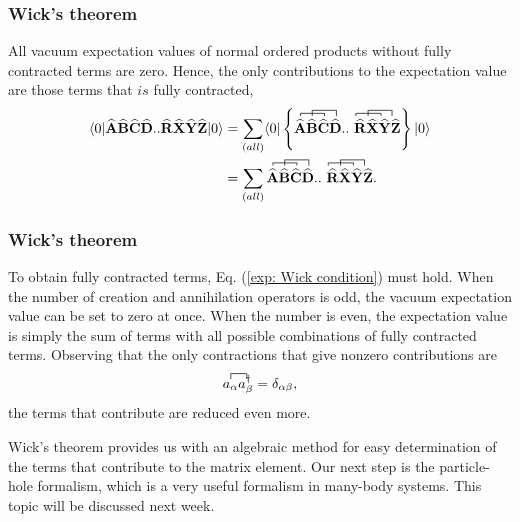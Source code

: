 \documentclass{beamer}
\newcommand*{\cre}[1]{a^{\dagger}_{#1}}
\newcommand*{\an}[1]{a_{#1}}
\newcommand*{\for}[3]{\langle#1|#2|#3\rangle}
\newcommand*{\kpr}[1]{\left\{#1\right\}}
\newcommand{\OP}[1]{{\bf\widehat{#1}}}
\newcommand*{\pr}[1]{\left(#1\right)}
\begin{document}
\frame
{
  \frametitle{Wick's theorem}
\begin{small}
{\scriptsize
All vacuum expectation values of normal ordered products without fully contracted terms are zero. Hence, the only contributions to the expectation value are those terms that $\textit{is}$ fully contracted,
\begin{align}
\for{0}{\OP{A}\OP{B}\OP{C}\OP{D}..\OP{R}\OP{X}\OP{Y}\OP{Z}}{0} &= \sum_{\pr{all}} \for{0}{\kpr{\contraction[0.5ex]{}{\OP{A}}{\OP{B}}{\OP{C}}\contraction[1.0ex]{\OP{A}}{\OP{B}}{\OP{C}}{\OP{D}} \OP{A}\OP{B}\OP{C}\OP{D}..\contraction[0.5ex]{}{\OP{R}}{\OP{X}}{\OP{Y}}\contraction[1.0ex]{\OP{R}}{\OP{X}}{\OP{Y}}{\OP{Z}}\ \OP{R}\OP{X}\OP{Y}\OP{Z}}}{0}\\
&= \sum_{\pr{all}} \contraction[0.5ex]{}{\OP{A}}{\OP{B}}{\OP{C}}\contraction[1.0ex]{\OP{A}}{\OP{B}}{\OP{C}}{\OP{D}} \OP{A}\OP{B}\OP{C}\OP{D}..\contraction[0.5ex]{}{\OP{R}}{\OP{X}}{\OP{Y}}\contraction[1.0ex]{\OP{R}}{\OP{X}}{\OP{Y}}{\OP{Z}}\ \OP{R}\OP{X}\OP{Y}\OP{Z}.
\end{align}
}
\end{small}
}

\frame
{
  \frametitle{Wick's theorem}
\begin{small}
{\scriptsize
To obtain fully contracted terms, Eq. (\ref{exp: Wick condition}) must hold. When the number of creation and annihilation operators is odd, the vacuum expectation value can be set to zero at once. When the number is even, the expectation value is simply the sum of terms with all possible combinations of fully contracted terms. Observing that the only contractions that give nonzero contributions are 
\begin{align}
\contraction{}{\an{\alpha}}{}{\cre{\beta}}
\an{\alpha}\cre{\beta} = \delta_{\alpha \beta},
\end{align}
the terms that contribute are reduced even more.

Wick's theorem provides us with an algebraic method for easy determination of the terms that contribute to the matrix element. Our next step is the particle-hole formalism, which is a very useful formalism in many-body systems. This topic will be discussed next week.
}
\end{small}
}
\end{document}
